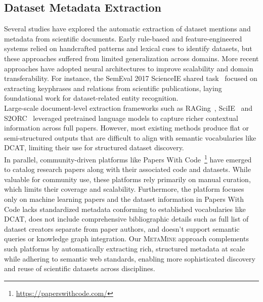 \documentclass[runningheads]{llncs}
\begin{document}
\subsection{Dataset Metadata Extraction}
Several studies have explored the automatic extraction of dataset mentions and metadata from scientific documents. Early rule-based and feature-engineered systems relied on handcrafted patterns and lexical cues to identify datasets, but these approaches suffered from limited generalization across domains. More recent approaches have adopted neural architectures to improve scalability and domain transferability. For instance, the SemEval 2017 ScienceIE shared task~\cite{augenstein2017semeval} focused on extracting keyphrases and relations from scientific publications, laying foundational work for dataset-related entity recognition.
\\
\noindent
Large-scale document-level extraction frameworks such as RAGing~\cite{datta2024raging}, SciIE~\cite{luan2018multi} and S2ORC~\cite{lo2019s2orc} leveraged pretrained language models to capture richer contextual information across full papers. However, most existing methods produce flat or semi-structured outputs that are difficult to align with semantic vocabularies like DCAT, limiting their use for structured dataset discovery.
\\
\noindent
In parallel, community-driven platforms like Papers With Code~\footnote{\url{https://paperswithcode.com/}} have emerged to catalog research papers along with their associated code and datasets. While valuable for community use, these platforms rely primarily on manual curation, which limits their coverage and scalability. Furthermore, the platform focuses only on machine learning papers and the dataset information in Papers With Code lacks standardized metadata conforming to established vocabularies like DCAT, does not include comprehensive bibliographic details such as full list of dataset creators separate from paper authors, and doesn't support semantic queries or knowledge graph integration. Our \textsc{MetaMine} approach complements such platforms by automatically extracting rich, structured metadata at scale while adhering to semantic web standards, enabling more sophisticated discovery and reuse of scientific datasets across disciplines.
\end{document}

